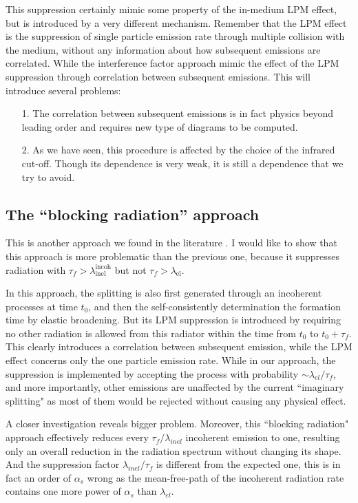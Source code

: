 This suppression certainly mimic some property of the in-medium LPM effect, but is introduced by a very different mechanism.
Remember that the LPM effect is the suppression of single particle emission rate through multiple collision with the medium, without any information about how subsequent emissions are correlated. 
While the interference factor approach mimic the effect of the LPM suppression through correlation between subsequent emissions.
This will introduce several problems: 
\begin{itemize}
\item[1.] The correlation between subsequent emissions is in fact physics beyond leading order and requires new type of diagrams to be computed.
\item[2.] As we have seen, this procedure is affected by the choice of the infrared cut-off. Though its dependence is very weak, it is still a dependence that we try to avoid.
\end{itemize}

\subsection{The ``blocking radiation'' approach}
This is another approach we found in the literature \cite{ColemanSmith:2012vr}.
I would like to show that this approach is more problematic than the previous one, because it suppresses radiation with $\tau_f > \lambda_{\textrm{inel}}^{\textrm{incoh}}$ but not $\tau_f > \lambda_{\textrm{el}}$.

In this approach, the splitting is also first generated through an incoherent processes at time $t_0$, and then the self-consistently determination the formation time by elastic broadening. 
But its LPM suppression is introduced by requiring no other radiation is allowed from this radiator within the time from $t_0$ to $t_0 + \tau_f$.
This clearly introduces a correlation between subsequent emission, while the LPM effect concerns only the one particle emission rate.
While in our approach, the suppression is implemented by accepting the process with probability $\sim \lambda_{el}/\tau_f$, and more importantly, other emissions are unaffected by the current ``imaginary splitting" as most of them would be rejected without causing any physical effect.

A closer investigation reveals bigger problem.
Moreover, this ``blocking radiation" approach effectively reduces every $\tau_f/\lambda_{inel}$ incoherent emission to one, resulting only an overall reduction in the radiation spectrum without changing its shape.
And the suppression factor $\lambda_{inel}/\tau_f$ is different from the expected one, this is in fact an order of $\alpha_s$ wrong as the mean-free-path of the incoherent radiation rate contains one more power of $\alpha_s$ than $\lambda_{el}$.

